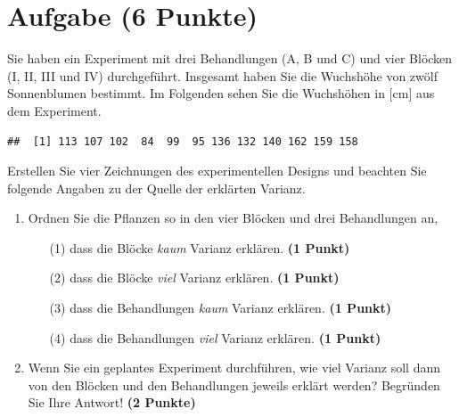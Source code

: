 \documentclass[a4paper, 10pt]{scrartcl}\usepackage[]{graphicx}\usepackage[]{xcolor}
\makeatletter
\newenvironment{kframe}{%
 \def\at@end@of@kframe{}%
 \ifinner\ifhmode%
  \def\at@end@of@kframe{\end{minipage}}%
  \begin{minipage}{\columnwidth}%
 \fi\fi%
 \def\FrameCommand##1{\hskip\@totalleftmargin \hskip-\fboxsep
 \colorbox{shadecolor}{##1}\hskip-\fboxsep
     \hskip-\linewidth \hskip-\@totalleftmargin \hskip\columnwidth}%
 \MakeFramed {\advance\hsize-\width
   \@totalleftmargin\z@ \linewidth\hsize
   \@setminipage}}%
 {\par\unskip\endMakeFramed%
 \at@end@of@kframe}
\newenvironment{knitrout}{}{} %
\makeatother
\begin{document}
\clearpage

\section{Aufgabe \hfill (6 Punkte)}

Sie haben ein Experiment mit drei Behandlungen (A, B und C) und vier
Bl{\"o}cken (I, II, III und IV) durchgef{\"u}hrt. Insgesamt haben Sie die Wuchsh{\"o}he
von zw{\"o}lf Sonnenblumen bestimmt. Im Folgenden sehen Sie die Wuchsh{\"o}hen in
[cm] aus dem Experiment.


\begin{knitrout}
\color{fgcolor}\begin{kframe}
\begin{verbatim}
##  [1] 113 107 102  84  99  95 136 132 140 162 159 158
\end{verbatim}
\end{kframe}
\end{knitrout}

Erstellen Sie vier Zeichnungen des experimentellen Designs und beachten
Sie folgende Angaben zu der Quelle der erkl{\"a}rten Varianz. 

\begin{enumerate}
\item Ordnen Sie die Pflanzen so in den vier Bl{\"o}cken und drei Behandlungen an,
  \begin{enumerate}
  \item[(1)] dass die Bl{\"o}cke \textit{kaum} Varianz erkl{\"a}ren. \textbf{(1 Punkt)}
  \item[(2)] dass die Bl{\"o}cke \textit{viel} Varianz erkl{\"a}ren. \textbf{(1 Punkt)}  
  \item[(3)] dass die Behandlungen \textit{kaum} Varianz erkl{\"a}ren. \textbf{(1 Punkt)}
  \item[(4)] dass die Behandlungen \textit{viel} Varianz erkl{\"a}ren. \textbf{(1 Punkt)}
  \end{enumerate}
\item Wenn Sie ein geplantes Experiment durchf{\"u}hren, wie viel Varianz soll dann von
  den Bl{\"o}cken und den Behandlungen jeweils erkl{\"a}rt werden? Begr{\"u}nden Sie
  Ihre Antwort! \textbf{(2 Punkte)}
\end{enumerate}
 
\clearpage
\end{document}
